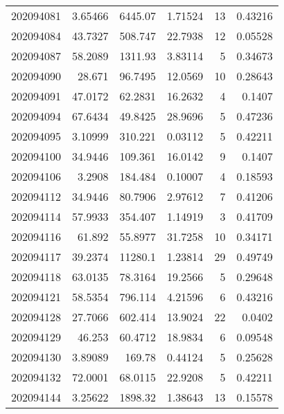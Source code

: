 \begin{tabular}{rrrrrr}
 202094081 &          3.65466 &     6445.07   &            1.71524 &          13 & 0.43216 \\
 202094084 &         43.7327  &      508.747  &           22.7938  &          12 & 0.05528 \\
 202094087 &         58.2089  &     1311.93   &            3.83114 &           5 & 0.34673 \\
 202094090 &         28.671   &       96.7495 &           12.0569  &          10 & 0.28643 \\
 202094091 &         47.0172  &       62.2831 &           16.2632  &           4 & 0.1407  \\
 202094094 &         67.6434  &       49.8425 &           28.9696  &           5 & 0.47236 \\
 202094095 &          3.10999 &      310.221  &            0.03112 &           5 & 0.42211 \\
 202094100 &         34.9446  &      109.361  &           16.0142  &           9 & 0.1407  \\
 202094106 &          3.2908  &      184.484  &            0.10007 &           4 & 0.18593 \\
 202094112 &         34.9446  &       80.7906 &            2.97612 &           7 & 0.41206 \\
 202094114 &         57.9933  &      354.407  &            1.14919 &           3 & 0.41709 \\
 202094116 &         61.892   &       55.8977 &           31.7258  &          10 & 0.34171 \\
 202094117 &         39.2374  &    11280.1    &            1.23814 &          29 & 0.49749 \\
 202094118 &         63.0135  &       78.3164 &           19.2566  &           5 & 0.29648 \\
 202094121 &         58.5354  &      796.114  &            4.21596 &           6 & 0.43216 \\
 202094128 &         27.7066  &      602.414  &           13.9024  &          22 & 0.0402  \\
 202094129 &         46.253   &       60.4712 &           18.9834  &           6 & 0.09548 \\
 202094130 &          3.89089 &      169.78   &            0.44124 &           5 & 0.25628 \\
 202094132 &         72.0001  &       68.0115 &           22.9208  &           5 & 0.42211 \\
 202094144 &          3.25622 &     1898.32   &            1.38643 &          13 & 0.15578 \\

\end{tabular}

